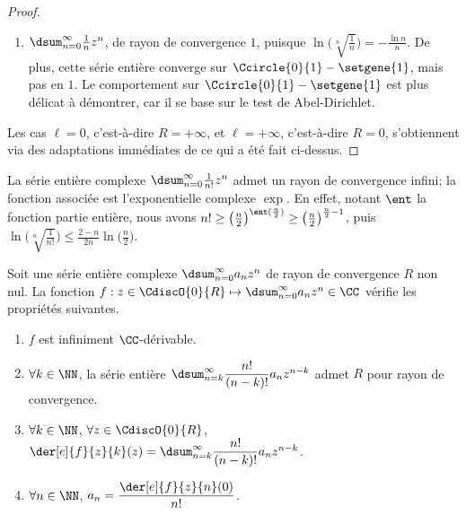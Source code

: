 \begin{proof}
\begin{itemize}
\begin{enumerate}[label=(\alph*)]
	        \item $\dsum_{n=0}^{\infty}  \frac{1}{n} z^n$, 
	        de rayon de convergence $1$,
	        puisque 
	        $ \ln \big( \sqrt[n]{\frac{1}{n}} \big)
	        = -\frac{\ln n}{n}$.
	        De plus,
	        cette série entière converge sur $\Ccircle{0}{1} - \setgene{1}$, mais pas en $1$. 
	        Le comportement sur $\Ccircle{0}{1} - \setgene{1}$ est plus délicat à démontrer, car il se base sur le test de Abel-Dirichlet.
	    \end{enumerate}
    \end{itemize}


    Les cas
    $\ell = 0$, c'est-à-dire $R = +\infty$,
    et
    $\ell = +\infty$, c'est-à-dire $R = 0$,
    s'obtiennent via des adaptations immédiates de ce qui a été fait ci-dessus.
\end{proof}


\begin{example}
	La série entière complexe $\dsum_{n=0}^{\infty} \frac{1}{n!} z^n$ admet un rayon de convergence infini; la fonction associée est l'exponentielle complexe $\exp$.
	En effet,
	notant $\ent$ la fonction partie entière, nous avons
	$n! \geq \big( \frac{n}{2} \big)^{\ent (\frac{n}{2})} \geq \big( \frac{n}{2} \big)^{\frac{n}{2} - 1}$,
	puis
	$ \ln \big( \sqrt[n]{\frac{1}{n!}} \big)
	\leq
	  \frac{2 - n}{2 n} \ln \big( \frac{n}{2} \big)$.
\end{example}




\begin{preli} \label{der-power-serie}
    Soit une série entière complexe $\dsum_{n=0}^{\infty} a_n z^n$ de rayon de convergence $R$ non nul.
    La fonction $f: z \in \CdiscO{0}{R} \mapsto \dsum_{n=0}^{\infty} a_n z^n \in \CC$ vérifie les propriétés suivantes.
    \begin{enumerate}
    	\item $f$ est infiniment $\CC$-dérivable.

    	\item $\forall k \in \NN$,
		la série entière $\dsum_{n = k}^{\infty} \dfrac{n!}{(n-k)!} a_n z^{n - k}$ admet $R$ pour rayon de convergence.

    	\item $\forall k \in \NN$, $\forall z \in \CdiscO{0}{R}$,
		$\der[e]{f}{z}{k}(z) = \dsum_{n = k}^{\infty} \dfrac{n!}{(n-k)!} a_n z^{n - k}$.

    	\item \label{a_n-value}
		$\forall n \in \NN$,  $a_n = \dfrac{\der[e]{f}{z}{n}(0)}{n!}$.
    \end{enumerate}
\end{preli}


